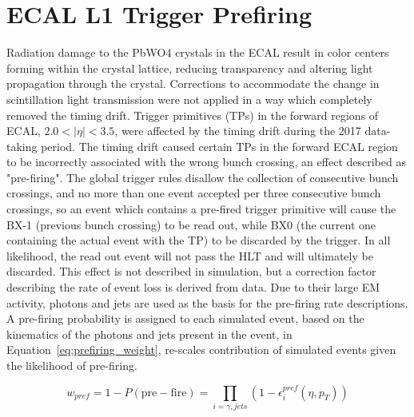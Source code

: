 \section{ECAL L1 Trigger Prefiring}\label{ch:prefire}
Radiation damage to the PbWO4 crystals in the ECAL result in color centers forming within the crystal lattice, reducing transparency and altering light propagation through the crystal. Corrections to accommodate the change in scintillation light transmission were not applied in a way which completely removed the timing drift. Trigger primitives (TPs) in the forward regions of ECAL, $2.0 < |\eta| < 3.5$, were affected by the timing drift during the 2017 data-taking period. The timing drift caused certain TPs in the forward ECAL region to be incorrectly associated with the wrong bunch crossing, an effect described as "pre-firing". The global trigger rules disallow the collection of consecutive bunch crossings, and no more than one event accepted per three consecutive bunch crossings, so an event which contains a pre-fired trigger primitive will cause the BX-1 (previous bunch crossing) to be read out, while BX0 (the current one containing the actual event with the TP) to be discarded by the trigger. In all likelihood, the read out event will not pass the HLT and will ultimately be discarded.
This effect is not described in simulation, but a correction factor describing the rate of event loss is derived from data. Due to their large EM activity, photons and jets are used as the basis for the pre-firing rate descriptions. A pre-firing probability is assigned to each simulated event, based on the kinematics of the photons and jets present in the event, in Equation~\ref{eq:prefiring_weight}, re-scales contribution of simulated events given the likelihood of pre-firing.

\begin{equation}
    w_{pref} = 1 - P(\mathrm{pre-fire}) = \prod_{i=\gamma,jets}{(1 - \epsilon_i^{pref}(\eta,p_T))}
    \label{eq:prefiring_weight}
\end{equation}
